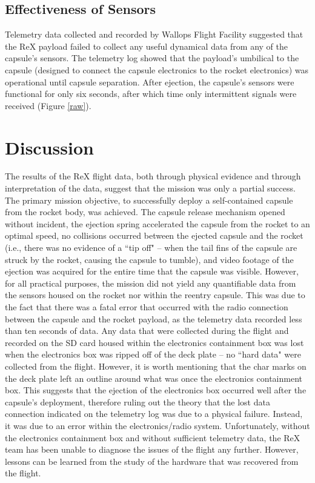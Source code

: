 \documentclass{article}
\begin{document}
\begin{doublespace}
	\subsection{Effectiveness of Sensors}
		\indent\indent Telemetry data collected and recorded by Wallops Flight Facility suggested that the ReX payload failed to collect any useful dynamical data from any of the capsule's sensors. The telemetry log showed that the payload's umbilical to the capsule (designed to connect the capsule electronics to the rocket electronics) was operational until capsule separation. After ejection, the capsule's sensors were functional for only six seconds, after which time only intermittent signals were received (Figure \ref{raw}).
		\end{doublespace}

\section{Discussion}
	\begin{doublespace}
		\indent\indent The results of the ReX flight data, both through physical evidence and through interpretation of the data, suggest that the mission was only a partial success. The primary mission objective, to successfully deploy a self-contained capsule from the rocket body, was achieved. The capsule release mechanism opened without incident, the ejection spring accelerated the capsule from the rocket to an optimal speed, no collisions occurred between the ejected capsule and the rocket (i.e., there was no evidence of a ``tip off" -- when the tail fins of the capsule are struck by the rocket, causing the capsule to tumble), and video footage of the ejection was acquired for the entire time that the capsule was visible. However, for all practical purposes, the mission did not yield any quantifiable data from the sensors housed on the rocket nor within the reentry capsule. This was due to the fact that there was a fatal error that occurred with the radio connection between the capsule and the rocket payload, as the telemetry data recorded less than ten seconds of data. Any data that were collected during the flight and recorded on the SD card housed within the electronics containment box was lost when the electronics box was ripped off of the deck plate -- no ``hard data" were collected from the flight. However, it is worth mentioning that the char marks on the deck plate left an outline around what was once the electronics containment box. This suggests that the ejection of the electronics box occurred well after the capsule's deployment, therefore ruling out the theory that the lost data connection indicated on the telemetry log was due to a physical failure. Instead, it was due to an error within the electronics/radio system. Unfortunately, without the electronics containment box and without sufficient telemetry data, the ReX team has been unable to diagnose the issues of the flight any further. However, lessons can be learned from the study of the hardware that was recovered from the flight.
	\end{doublespace}
\end{document}

